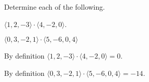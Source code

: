 \begin{activity} \label{A:9.3.2}  Determine each of the following.
  \ba
\item $\langle 1, 2, -3 \rangle \cdot \langle 4, -2, 0 \rangle$.

\item $\langle 0, 3, -2, 1 \rangle \cdot \langle 5, -6, 0, 4 \rangle$

  \ea
\end{activity}

\begin{activitySolution}
	\ba
	\item By definition $\langle 1, 2, -3 \rangle \cdot \langle 4, -2, 0 \rangle = 0$.
	
	\item By definition $\langle 0, 3, -2, 1 \rangle \cdot \langle 5, -6, 0, 4 \rangle = -14$.
	\ea
\end{activitySolution}

\aftera

